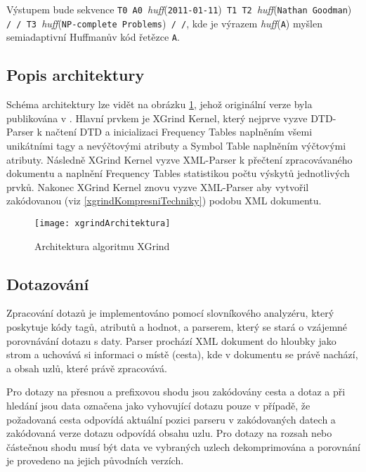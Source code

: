 Výstupem bude sekvence \texttt{T0 A0 }\textit{huff}(\texttt{2011-01-11})\texttt{ T1 T2 }\textit{huff}(\texttt{Nathan Goodman})\texttt{ / / T3 }\textit{huff}(\texttt{NP-complete Problems})\texttt{ / /}, kde je výrazem \textit{huff}(\texttt{A}) myšlen semiadaptivní Huffmanův kód řetězce \texttt{A}.

\subsection{Popis architektury}
Schéma architektury lze vidět na obrázku \ref{architekturaXGrind}, jehož originální verze byla publikována v \cite{xgrind}. Hlavní prvkem je XGrind Kernel, který nejprve vyzve DTD-Parser k načtení DTD a inicializaci Frequency Tables naplněním všemi unikátními tagy a nevýčtovými atributy a Symbol Table naplněním výčtovými atributy. Následně XGrind Kernel vyzve XML-Parser k přečtení zpracovávaného dokumentu a naplnění Frequency Tables statistikou počtu výskytů jednotlivých prvků. Nakonec XGrind Kernel znovu vyzve XML-Parser aby vytvořil zakódovanou (viz \ref{xgrindKompresniTechniky}) podobu XML dokumentu. \cite{xgrind}

\begin{figure}[!htb]
\centering
\texttt{[image: xgrindArchitektura]}
\caption{Architektura algoritmu XGrind}
\label{architekturaXGrind}
\end{figure}

\subsection{Dotazování}
Zpracování dotazů je implementováno pomocí slovníkového analyzéru, který poskytuje kódy tagů, atributů a hodnot, a parserem, který se stará o vzájemné porovnávání dotazu s daty. Parser prochází XML dokument do hloubky jako strom a uchovává si informaci o místě (cesta), kde v dokumentu se právě nachází, a obsah uzlů, které právě zpracovává.

Pro dotazy na přesnou a prefixovou shodu jsou zakódovány cesta a dotaz a při hledání jsou data označena jako vyhovující dotazu pouze v případě, že požadovaná cesta odpovídá aktuální pozici parseru v zakódovaných datech a zakódovaná verze dotazu odpovídá obsahu uzlu. Pro dotazy na rozsah nebo částečnou shodu musí být data ve vybraných uzlech dekomprimována a porovnání je provedeno na jejich původních verzích. \cite{xgrind}